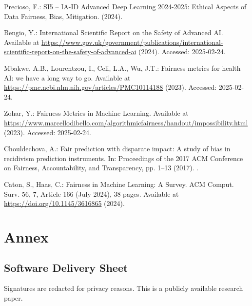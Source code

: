 \documentclass[runningheads]{llncs}
\begin{document}
\begin{thebibliography}{8}
Precioso, F.: SI5 – IA-ID Advanced Deep Learning 2024-2025: Ethical Aspects of Data Fairness, Bias, Mitigation. (2024).

Bengio, Y.: International Scientific Report on the Safety of Advanced AI. Available at \url{https://www.gov.uk/government/publications/international-scientific-report-on-the-safety-of-advanced-ai} (2024). Accessed: 2025-02-24.

Mbakwe, A.B., Lourentzou, I., Celi, L.A., Wu, J.T.: Fairness metrics for health AI: we have a long way to go. Available at \url{https://pmc.ncbi.nlm.nih.gov/articles/PMC10114188} (2023). Accessed: 2025-02-24.

Zohar, Y.: Fairness Metrics in Machine Learning. Available at \url{https://www.marcellodibello.com/algorithmicfairness/handout/impossibility.html} (2023). Accessed: 2025-02-24.

Chouldechova, A.: Fair prediction with disparate impact: A study of bias in recidivism prediction instruments. In: Proceedings of the 2017 ACM Conference on Fairness, Accountability, and Transparency, pp. 1--13 (2017). .

Caton, S., Haas, C.: Fairness in Machine Learning: A Survey. ACM Comput. Surv. 56, 7, Article 166 (July 2024), 38 pages. Available at \url{https://doi.org/10.1145/3616865} (2024).

\end{thebibliography}
\appendix

\section{Annex}
\subsection{Software Delivery Sheet} 
Signatures are redacted for privacy reasons. This is a publicly available research paper.

\end{document}

